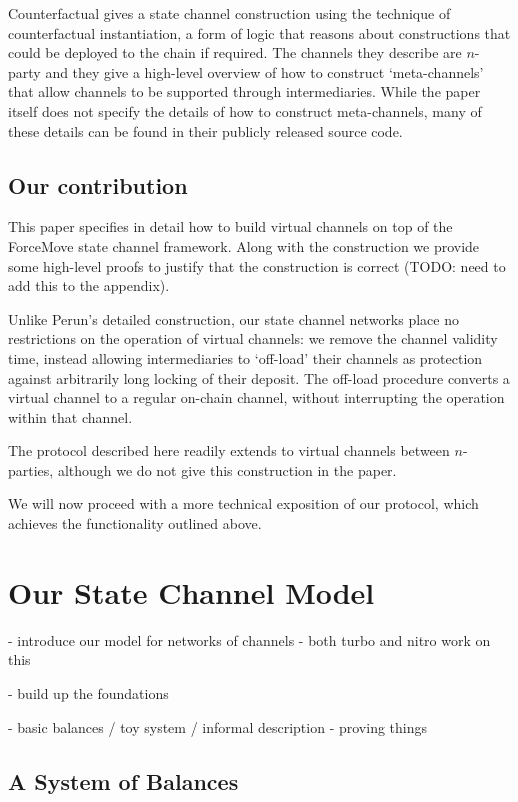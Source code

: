 \documentclass{article}
\begin{document}
Counterfactual gives a state channel construction using the technique of counterfactual instantiation, a form of logic that reasons about constructions that could be deployed to the chain if required.
The channels they describe are $n$-party and they give a high-level overview of how to construct `meta-channels' that allow channels to be supported through intermediaries.
While the paper itself does not specify the details of how to construct meta-channels, many of these details can be found in their publicly released source code.

\subsection{Our contribution}

This paper specifies in detail how to build virtual channels on top of the ForceMove state channel framework.
Along with the construction we provide some high-level proofs to justify that the construction is correct (TODO: need to add this to the appendix).

Unlike Perun's detailed construction, our state channel networks place no restrictions on the operation of virtual channels:
we remove the channel validity time, instead allowing intermediaries to `off-load' their channels as protection against arbitrarily long locking of their deposit.
The off-load procedure converts a virtual channel to a regular on-chain channel, without interrupting the operation within that channel.

The protocol described here readily extends to virtual channels between $n$-parties, although we do not give this construction in the paper.

We will now proceed with a more technical exposition of our protocol, which achieves the functionality outlined above.

\section{Our State Channel Model}

- introduce our model for networks of channels
- both turbo and nitro work on this

- build up the foundations

- basic balances / toy system / informal description
- proving things

\subsection{A System of Balances}
\end{document}
